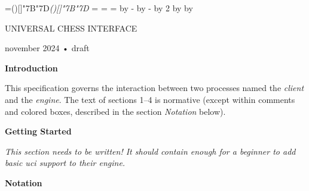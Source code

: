 \long{}%
%
\def\hex#1{{\fw\color{\r{ltgrey_fg}}{\cas x}#1}}%
\def\uni#1{{\caps u+#1}}%
%
\def\ellipsis{.\ot.\ot.}
%
\newcount\majorcount
\newcount\minorcount
\def\major{%
  \advance\majorcount by 1
  \minorcount=0
  \leavevmode
  \llap{\label{\the\majorcount}\hem}%
}%
\def\minor{%
  \advance\minorcount by 1
  \leavevmode
  \llap{\label{\the\majorcount·\the\minorcount}\hem}%
}%
\def\gets{<-}%
\def\to  {->}%
\def\then{=>}%
%
=\hbox{\fw ()[]\char"7B\char"7D\it ()[]\char"7B\char"7D}%
\newdimen\strutht
\newdimen\strutdp
\strutht=
\strutdp=
=\baselineskip
\advance{} by -\strutht
\advance{} by -\strutdp
\divide{} by 2
\advance\strutht by 
\advance\strutdp by 
\def\strut{\vrule width 0pt height \strutht depth \strutdp}%
%
\def\tab{%
  \kern 0.75ex
  \color{\r{ltgrey_fg}}{\vrule width 0.5pt}%
  \kern -0.5pt
  \kern -0.75ex
  \kern 3ex
}%
%
\def\kwd  #1{\color{\r{  blue_fg}}{#1}}%
\def\flow #1{\color{\r{ amber_fg}}{#1}}%
\def\liter#1{\color{\r{   red_fg}}{#1}}%
\def\const#1{\color{\r{ lilac_fg}}{#1}}%
\def\func #1{\color{\r{ green_fg}}{#1}}%
\def\var  #1{{\ifw #1}}%
%
\centerline{ UNIVERSAL CHESS INTERFACE}
\centerline{ november 2024 • draft}

\baselineskip

{\bf Introduction}

This specification governs the interaction between two processes named the
{\it client} and the {\it engine}.  The text of
sections 1–4 is normative (except within comments and colored boxes, described
in the section {\it Notation} below).

{\bf Getting Started}

{\it This section needs to be written! It should contain enough for a beginner
to add basic {\icap uci} support to their engine.}

\vfil\break

{\bf Notation}

